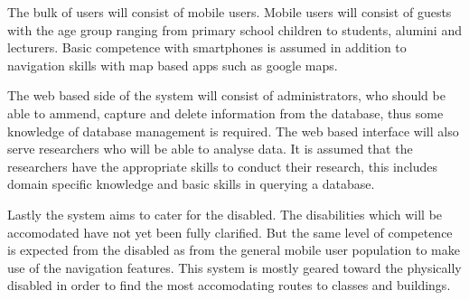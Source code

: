 The bulk of users will consist of mobile users. Mobile users will consist of guests with the age group ranging from primary school children to students, alumini and lecturers. Basic competence with smartphones is assumed in addition to navigation skills with map based apps such as google maps.
\par
\bigskip
\noindent
The web based side of the system will consist of administrators, who should be able to ammend, capture and delete information from the database, thus some knowledge of database management is required. The web based interface will also serve researchers who will be able to analyse data. It is assumed that the researchers have the appropriate skills to conduct their research, this includes domain specific knowledge and basic skills in querying a database.
\par
\bigskip
\noindent
Lastly the system aims to cater for the disabled. The disabilities which will be accomodated have not yet been fully clarified. But the same level of competence is expected from the disabled as from the general mobile user population to make use of the navigation features. This system is mostly geared toward the physically disabled in order to find the most accomodating routes to classes and buildings.
